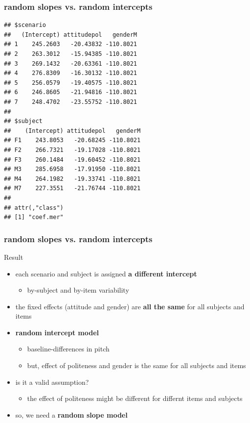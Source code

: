 \documentclass[10p]{beamer}\usepackage[]{graphicx}\usepackage[]{color}
\makeatletter
\newenvironment{kframe}{%
 \def\at@end@of@kframe{}%
 \ifinner\ifhmode%
  \def\at@end@of@kframe{\end{minipage}}%
  \begin{minipage}{\columnwidth}%
 \fi\fi%
 \def\FrameCommand##1{\hskip\@totalleftmargin \hskip-\fboxsep
 \colorbox{shadecolor}{##1}\hskip-\fboxsep
     \hskip-\linewidth \hskip-\@totalleftmargin \hskip\columnwidth}%
 \MakeFramed {\advance\hsize-\width
   \@totalleftmargin\z@ \linewidth\hsize
   \@setminipage}}%
 {\par\unskip\endMakeFramed%
 \at@end@of@kframe}
\newenvironment{knitrout}{}{} %
\makeatother
\begin{document}
\begin{frame}[fragile]
\frametitle{random slopes vs. random intercepts}
\begin{knitrout}\scriptsize
{}\color{fgcolor}\begin{kframe}
\begin{verbatim}
## $scenario
##   (Intercept) attitudepol   genderM
## 1    245.2603   -20.43832 -110.8021
## 2    263.3012   -15.94385 -110.8021
## 3    269.1432   -20.63361 -110.8021
## 4    276.8309   -16.30132 -110.8021
## 5    256.0579   -19.40575 -110.8021
## 6    246.8605   -21.94816 -110.8021
## 7    248.4702   -23.55752 -110.8021
## 
## $subject
##    (Intercept) attitudepol   genderM
## F1    243.8053   -20.68245 -110.8021
## F2    266.7321   -19.17028 -110.8021
## F3    260.1484   -19.60452 -110.8021
## M3    285.6958   -17.91950 -110.8021
## M4    264.1982   -19.33741 -110.8021
## M7    227.3551   -21.76744 -110.8021
## 
## attr(,"class")
## [1] "coef.mer"
\end{verbatim}
\end{kframe}
\end{knitrout}
\end{frame}

\begin{frame}
\frametitle{random slopes vs. random intercepts}
Result
\begin{itemize}
\item each scenario and subject is assigned \textbf{a different intercept}
  \begin{itemize}
  \item by-subject and by-item variability
  \end{itemize}
\item the fixed effects (attitude and gender) are \textbf{all the same} for all subjects and items
\item \textbf{random intercept model}
  \begin{itemize}
  \item baseline-differences in pitch
  \item but, effect of politeness and gender is the same for all subjects and items
  \end{itemize}
\item is it a valid assumption?
  \begin{itemize}
  \item the effect of politeness might be different for differnt items and subjects
  \end{itemize}
\item so, we need a \textbf{random slope model}
\end{itemize}
\end{frame}
\end{document}

